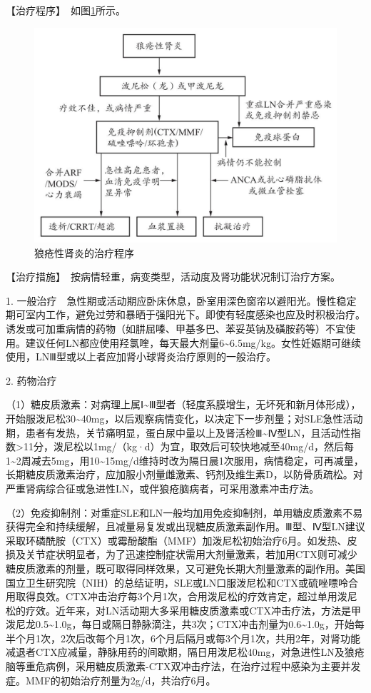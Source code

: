 【治疗程序】　如图\ref{fig4-2-1}所示。

\begin{figure}[!htbp]
 \centering
 \includegraphics{./images/Image00125.jpg}
 \captionsetup{justification=centering}
 \caption{狼疮性肾炎的治疗程序}
 \label{fig4-2-1}
  \end{figure} 

【治疗措施】　按病情轻重，病变类型，活动度及肾功能状况制订治疗方案。

1.
一般治疗　急性期或活动期应卧床休息，卧室用深色窗帘以避阳光。慢性稳定期可室内工作，避免过劳和暴晒于强阳光下。即使有轻度感染也应及时积极治疗。诱发或可加重病情的药物（如肼屈嗪、甲基多巴、苯妥英钠及磺胺药等）不宜使用。建议任何LN都应使用羟氯喹，每天最大剂量6\textasciitilde{}6.5mg/kg。女性妊娠期可继续使用，LNⅢ型或以上者应加肾小球肾炎治疗原则的一般治疗。

2. 药物治疗

（1）糖皮质激素：对病理上属Ⅰ\textasciitilde{}Ⅲ型者（轻度系膜增生，无坏死和新月体形成），开始服泼尼松30\textasciitilde{}40mg，以后观察病情变化，以决定下一步剂量；对SLE急性活动期，患者有发热，关节痛明显，蛋白尿中量以上及肾活检Ⅲ\textasciitilde{}Ⅳ型LN，且活动性指数\textgreater{}11分，泼尼松以1mg/（kg·d）为宜，取效后可较快地减至40mg/d，然后每1\textasciitilde{}2周减去5mg，用10\textasciitilde{}15mg/d维持时改为隔日晨1次服用，病情稳定，可再减量，长期糖皮质激素治疗，应加服小剂量雌激素、钙剂及维生素D，以防骨质疏松。对严重肾病综合征或急进性LN，或伴狼疮脑病者，可采用激素冲击疗法。

（2）免疫抑制剂：对重症SLE和LN一般均加用免疫抑制剂，单用糖皮质激素不易获得完全和持续缓解，且减量易复发或出现糖皮质激素副作用。Ⅲ型、Ⅳ型LN建议采取环磷酰胺（CTX）或霉酚酸酯（MMF）加泼尼松初始治疗6月。如发热、皮损及关节症状明显者，为了迅速控制症状需用大剂量激素，若加用CTX则可减少糖皮质激素的剂量，既可取得同样效果，又可避免长期大剂量激素的副作用。美国国立卫生研究院（NIH）的总结证明，SLE或LN口服泼尼松和CTX或硫唑嘌呤合用取得良效。CTX冲击治疗每3个月1次，合用泼尼松的疗效肯定，超过单用泼尼松的疗效。近年来，对LN活动期大多采用糖皮质激素或CTX冲击疗法，方法是甲泼尼龙0.5\textasciitilde{}1.0g，每日或隔日静脉滴注，共3次；CTX冲击剂量为0.6\textasciitilde{}1.0g，开始每半个月1次，2次后改每个月1次，6个月后隔月或每3个月1次，共用2年，对肾功能减退者CTX应减量，静脉用药的间歇期，隔日用泼尼松40mg，对急进性LN及狼疮脑等重危病例，采用糖皮质激素-CTX双冲击疗法，在治疗过程中感染为主要并发症。MMF的初始治疗剂量为2g/d，共治疗6月。

